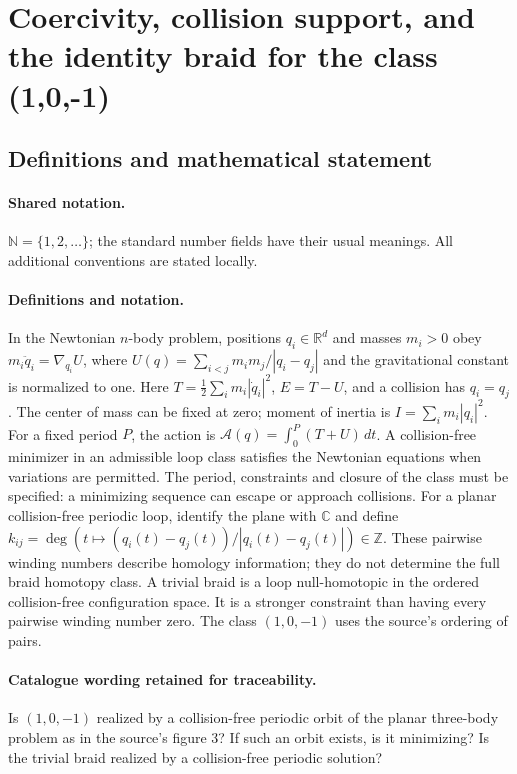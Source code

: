 \documentclass[11pt]{article}
\begin{document}
\section{Coercivity, collision support, and the identity braid for the class (1,0,-1)}\label{statement}

\subsection{Definitions and mathematical statement}

\paragraph{Shared notation.}$\mathbb N=\{1,2,\ldots\}$; the standard number fields have their usual meanings. All additional conventions are stated locally.


\paragraph{Definitions and notation.}In the Newtonian $n$-body problem, positions $q_i\in\mathbb R^d$ and masses $m_i>0$ obey $m_i\ddot q_i=\nabla_{q_i}U$, where $U(q)=\sum_{i<j}m_im_j/|q_i-q_j|$ and the gravitational constant is normalized to one. Here $T=\tfrac12\sum_i m_i|\dot q_i|^2$, $E=T-U$, and a collision has $q_i=q_j$. The center of mass can be fixed at zero; moment of inertia is $I=\sum_i m_i|q_i|^2$. For a fixed period $P$, the action is $\mathcal A(q)=\int_0^P(T+U)\,dt$. A collision-free minimizer in an admissible loop class satisfies the Newtonian equations when variations are permitted. The period, constraints and closure of the class must be specified: a minimizing sequence can escape or approach collisions. For a planar collision-free periodic loop, identify the plane with $\mathbb C$ and define $k_{ij}=\deg(t\mapsto(q_i(t)-q_j(t))/|q_i(t)-q_j(t)|)\in\mathbb Z$. These pairwise winding numbers describe homology information; they do not determine the full braid homotopy class. A trivial braid is a loop null-homotopic in the ordered collision-free configuration space. It is a stronger constraint than having every pairwise winding number zero. The class $(1,0,-1)$ uses the source’s ordering of pairs.

\paragraph{Catalogue wording retained for traceability.}
Is $(1,0,-1)$ realized by a collision-free periodic orbit of the planar three-body problem as in the source’s figure 3? If such an orbit exists, is it minimizing? Is the trivial braid realized by a collision-free periodic solution?
\end{document}
